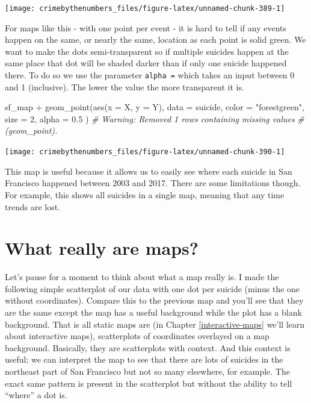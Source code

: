 \documentclass[
  a4paper,
]{krantz}
\makeatletter
\newenvironment{Shaded}{\begin{snugshade}}{\end{snugshade}}
\newcommand{\AttributeTok}[1]{\textcolor[rgb]{0.61,0.61,0.61}{#1}}
\newcommand{\CommentTok}[1]{\textcolor[rgb]{0.37,0.37,0.37}{\textit{#1}}}
\newcommand{\DecValTok}[1]{\textcolor[rgb]{0.06,0.06,0.06}{#1}}
\newcommand{\FloatTok}[1]{\textcolor[rgb]{0.06,0.06,0.06}{#1}}
\newcommand{\FunctionTok}[1]{\textcolor[rgb]{0,0,0}{#1}}
\newcommand{\NormalTok}[1]{#1}
\newcommand{\SpecialCharTok}[1]{\textcolor[rgb]{0,0,0}{#1}}
\newcommand{\StringTok}[1]{\textcolor[rgb]{0.5,0.5,0.5}{#1}}
\newenvironment{kframe}{%
\medskip{}
\setlength{\fboxsep}{.8em}
 \def\at@end@of@kframe{}%
 \ifinner\ifhmode%
  \def\at@end@of@kframe{\end{minipage}}%
  \begin{minipage}{\columnwidth}%
 \fi\fi%
 \def\FrameCommand##1{\hskip\@totalleftmargin \hskip-\fboxsep
 \colorbox{shadecolor}{##1}\hskip-\fboxsep
     \hskip-\linewidth \hskip-\@totalleftmargin \hskip\columnwidth}%
 \MakeFramed {\advance\hsize-\width
   \@totalleftmargin\z@ \linewidth\hsize
   \@setminipage}}%
 {\par\unskip\endMakeFramed%
 \at@end@of@kframe}
\renewenvironment{Shaded}{\begin{kframe}}{\end{kframe}}
\makeatother
\begin{document}
\begin{center}\texttt{[image: crimebythenumbers\_files/figure-latex/unnamed-chunk-389-1]} \end{center}

For maps like this - with one point per event - it is hard
to tell if any events happen on the same, or nearly the
same, location as each point is solid green. We want to make
the dots semi-transparent so if multiple suicides happen at
the same place that dot will be shaded darker than if only
one suicide happened there. To do so we use the parameter
\texttt{alpha\ =} which takes an input between 0 and 1
(inclusive). The lower the value the more transparent it is.

\begin{Shaded}
\begin{Highlighting}[]
\NormalTok{sf\_map }\SpecialCharTok{+}
  \FunctionTok{geom\_point}\NormalTok{(}\FunctionTok{aes}\NormalTok{(}\AttributeTok{x =}\NormalTok{ X, }\AttributeTok{y =}\NormalTok{ Y),}
    \AttributeTok{data  =}\NormalTok{ suicide,}
    \AttributeTok{color =} \StringTok{"forestgreen"}\NormalTok{,}
    \AttributeTok{size  =} \DecValTok{2}\NormalTok{,}
    \AttributeTok{alpha =} \FloatTok{0.5}
\NormalTok{  )}
\CommentTok{\# Warning: Removed 1 rows containing missing values}
\CommentTok{\# (geom\_point).}
\end{Highlighting}
\end{Shaded}

\begin{center}\texttt{[image: crimebythenumbers\_files/figure-latex/unnamed-chunk-390-1]} \end{center}

This map is useful because it allows us to easily see where
each suicide in San Francisco happened between 2003 and
2017. There are some limitations though. For example, this
shows all suicides in a single map, meaning that any time
trends are lost.

\hypertarget{what-really-are-maps}{%
\section{What really are maps?}\label{what-really-are-maps}}

Let's pause for a moment to think about what a map really
is. I made the following simple scatterplot of our data with
one dot per suicide (minus the one without coordinates).
Compare this to the previous map and you'll see that they
are the same except the map has a useful background while
the plot has a blank background. That is all static maps are
(in Chapter \ref{interactive-maps} we'll learn about
interactive maps), scatterplots of coordinates overlayed on
a map background. Basically, they are scatterplots with
context. And this context is useful; we can interpret the
map to see that there are lots of suicides in the northeast
part of San Francisco but not so many elsewhere, for
example. The exact same pattern is present in the
scatterplot but without the ability to tell ``where'' a dot
is.
\end{document}
